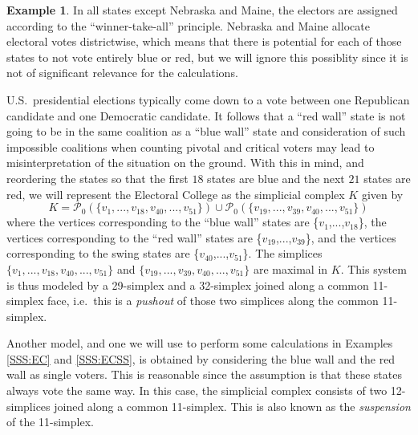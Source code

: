 \documentclass[11pt]{amsart}
\theoremstyle{plain}
\theoremstyle{definition}
\newtheorem{example}[thm]{Example}
\theoremstyle{remark}
\begin{document}
\begin{example}
%
%
%


In all states except Nebraska and Maine, the electors are assigned according to the ``winner-take-all'' principle. Nebraska and Maine allocate electoral votes districtwise, which means that there is potential for each of those states to not vote entirely blue or red, but we will ignore this possiblity since it is not of significant relevance for the calculations.

U.S.~presidential elections typically come down to a vote between one Republican candidate and one Democratic candidate. It follows that a “red wall” state is not going  to be in the same coalition as a “blue wall” state and consideration of such impossible coalitions when counting pivotal and critical voters may lead to misinterpretation of the situation on the ground. With this in mind, and reordering the states so that the first $18$ states are blue and the next $21$ states are red, we will represent the Electoral College as the simplicial complex $K$ given by 
$$K = \mathcal{P}_0(\{v_1,...,v_{18},v_{40},...,v_{51}\}) \cup \mathcal{P}_0(\{v_{19},...,v_{39},v_{40},...,v_{51}\})$$
where the vertices corresponding to the “blue wall” states are \{$v_1$,...,$v_{18}$\}, the vertices corresponding to the “red wall” states are \{$v_{19}$,...,$v_{39}$\}, and the vertices corresponding to the swing states are \{$v_{40}$,...,$v_{51}$\}. The simplices $\{v_1,...,v_{18},v_{40},...,v_{51}\}$ and $\{v_{19},...,v_{39},v_{40},...,v_{51}\}$ are maximal in $K$. This system is thus modeled by a 29-simplex and a 32-simplex joined along a common 11-simplex face, i.e.~this is a \emph{pushout} of those two simplices along the common 11-simplex. 

Another model, and one we will use to perform some calculations in Examples \ref{SSS:EC} and \ref{SSS:ECSS}, is obtained by considering the blue wall and the red wall as single voters. This is reasonable since the assumption is that these states always vote the same way. In this case, the simplicial complex consists of two 12-simplices joined along a common 11-simplex. This is also known as the \emph{suspension} of the 11-simplex.  
\end{example}
\end{document}
